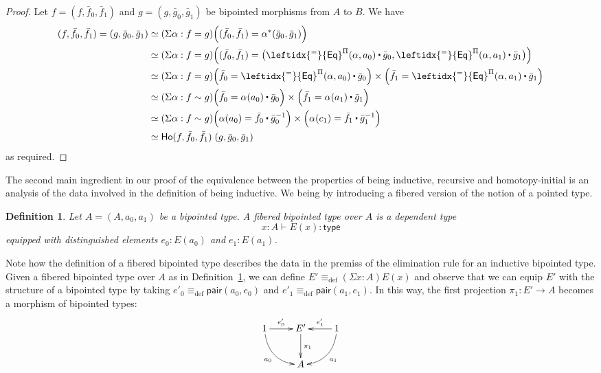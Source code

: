 \documentclass[reqno,10pt,a4paper,oneside]{amsart}
\numberwithin{equation}{section}
\theoremstyle{mythm}
\theoremstyle{mydef}
\newtheorem{definition}[theorem]{Definition}
\theoremstyle{myrmk}
\newcommand{\deq}{\equiv}
\newcommand{\defeq}{\deq_{\mathrm{def}}}
\newcommand{\co}{\colon}
\newcommand{\type}{\mathsf{type}}
\newcommand{\ct}{%
  \mathchoice{\mathbin{\raisebox{0.5ex}{$\displaystyle\centerdot$}}}%
             {\mathbin{\raisebox{0.5ex}{$\centerdot$}}}%
             {\mathbin{\raisebox{0.25ex}{$\scriptstyle\,\centerdot\,$}}}%
             {\mathbin{\raisebox{0.1ex}{$\scriptscriptstyle\,\centerdot\,$}}}}
\newcommand{\happly}{\leftidx{^=}{\mathsf{Eq}}^{\Pi}}
\newcommand{\pair}{\mathsf{pair}}
\newcommand{\Ho}{\mathsf{Ho}}
\begin{document}
\begin{proof} Let  $f = (f, \bar{f}_0, \bar{f}_1)$ and $g = (g, \bar{g}_0, \bar{g}_1)$ be bipointed
morphisms from $A$ to $B$. We have
\begin{align*}
 (f,\bar{f}_0,\bar{f}_1) = (g,\bar{g}_0,\bar{g}_1)  
&  \simeq (\Sigma \alpha : f = g) \Big((\bar{f}_0,\bar{f}_1) = \alpha^{\ast} (\bar{g}_0,\bar{g}_1) \Big) \\
&  \simeq (\Sigma \alpha : f = g) \Big((\bar{f}_0,\bar{f}_1) = \big(\happly(\alpha,a_0) \ct \bar{g}_0, \happly(\alpha,a_1) \ct \bar{g}_1\big) \Big)  \\
&  \simeq (\Sigma \alpha : f = g) \Big(\bar{f}_0 = \happly(\alpha,a_0) \ct \bar{g}_0\Big) \times \Big( \bar{f}_1 = \happly(\alpha,a_1) \ct \bar{g}_1 \Big) \\
&  \simeq (\Sigma \alpha : f \sim g) \Big(\bar{f}_0 = \alpha(a_0) \ct \bar{g}_0\Big) \times \Big(\bar{f}_1 = \alpha(a_1) \ct \bar{g}_1 \Big)  \\
& \simeq (\Sigma \alpha : f \sim g) \Big(\alpha(a_0) = \bar{f}_0 \ct \bar{g}^{-1}_0\Big) \times \Big(\alpha(c_1) = \bar{f}_1 \ct \bar{g}^{-1}_1 \Big)  \\
& \simeq  \Ho  (f,\bar{f}_0,\bar{f}_1) \; (g,\bar{g}_0,\bar{g}_1) 
\end{align*} 
as required.
\end{proof}

The second main ingredient in our proof of the equivalence between the properties of being inductive, recursive and homotopy-initial
is an analysis of the data involved in the definition of being inductive. We being by introducing a fibered version of the notion of a 
pointed type.


\begin{definition} \label{def:fibbipointed}
Let $A = (A, a_0, a_1)$ be a bipointed type. A \emph{fibered bipointed type} over $A$ is a dependent type
\[
x : A \vdash E(x) \co \type
\]
equipped with distinguished elements $e_0 \co E(a_0)$ and $e_1 \co E(a_1)$.
\end{definition}

Note how the definition of a fibered bipointed type describes the data in the premiss of the elimination rule for an inductive bipointed type. Given a 
fibered bipointed type over $A$ as in Definition~\ref{def:fibbipointed}, we can define $E' \defeq (\Sigma x : A) E(x)$ and observe that
we can equip $E'$ with the structure of a bipointed type by taking $e'_0 \defeq \pair(a_0, e_0)$ and $e'_1 \defeq \pair(a_1, e_1)$.
In this way, the first projection $\pi_1 \co E' \to A$ becomes a morphism of bipointed types:
\[
\xymatrix{
1 \ar@/_1pc/[dr]_{a_0} \ar[r]^-{e'_0} & E' \ar[d]^{\pi_1} & 1 \ar[l]_-{e'_1} \ar@/^1pc/[dl]^{a_1} \\ 
 & A & }
 \]
\end{document}

